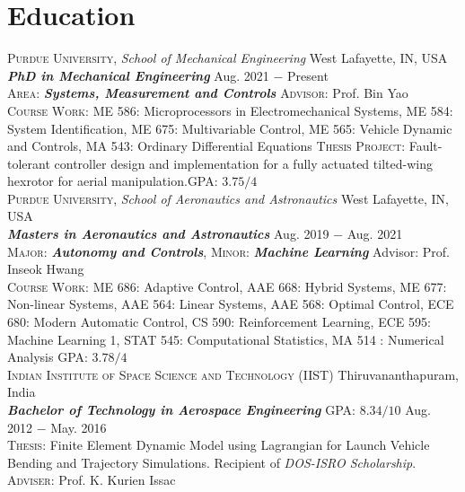 \documentclass[letterpaper,10pt]{article}
\begin{document}
\section{Education}
\noindent \textsc{Purdue University}, \textit{School of Mechanical Engineering} \hfill West Lafayette, IN, USA \\
\textbf{\textit{PhD in Mechanical Engineering}} \hfill Aug. 2021 $-$ Present\\
\textsc{Area}: \textit{\textbf{Systems, Measurement and Controls}}  \hfill \textsc{Advisor}: Prof. Bin Yao\\
\textsc{Course Work:} ME 586: Microprocessors in Electromechanical Systems, ME
584: System Identification, ME 675: Multivariable Control, ME 565: Vehicle Dynamic and Controls, MA 543: Ordinary Differential Equations
\textsc{Thesis Project}: Fault-tolerant controller design and implementation for a fully actuated tilted-wing hexrotor for aerial manipulation.\hfill \textsc{GPA}: $3.75/4$\\
\vspace{5pt}
\noindent \textsc{Purdue University}, \textit{School of Aeronautics and Astronautics} \hfill West Lafayette, IN, USA \\
\textbf{\textit{Masters in Aeronautics and Astronautics}} \hfill Aug. 2019 $-$ Aug. 2021\\
\textsc{Major}: \textit{\textbf{Autonomy and Controls}}, \textsc{Minor}: \textit{\textbf{Machine Learning}}
\hfill Advisor: Prof. Inseok Hwang\\
\textsc{Course Work}: ME 686: Adaptive Control, AAE 668: Hybrid Systems, ME 677: Non-linear Systems, AAE 564: Linear Systems,  AAE 568: Optimal Control, ECE 680: Modern Automatic Control, CS 590: Reinforcement Learning, ECE 595: Machine Learning 1, STAT 545: Computational Statistics, MA 514 : Numerical Analysis
\hfill \textsc{GPA}: $3.78/4$\\

\vspace{5pt}
\noindent \textsc{Indian Institute of Space Science and Technology (IIST)} \hfill Thiruvananthapuram, India\\
\textbf{\textit{Bachelor of Technology in Aerospace Engineering}} \hfill \textsc{GPA}: $8.34/10$ \hfill Aug. 2012 $-$ May. 2016 \\
\textsc{Thesis}: Finite Element Dynamic Model using Lagrangian for Launch
Vehicle Bending and Trajectory Simulations.
Recipient of \textit{DOS-ISRO Scholarship}.
\hfill \textsc{Adviser}: Prof. K. Kurien Issac \\
\end{document}

